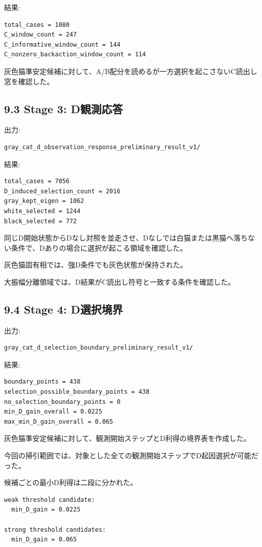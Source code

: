 \documentclass{article}
\begin{document}
結果:

\begin{verbatim}
total_cases = 1080
C_window_count = 247
C_informative_window_count = 144
C_nonzero_backaction_window_count = 114
\end{verbatim}

灰色猫準安定候補に対して、A/B配分を読めるが一方選択を起こさないC読出し窓を確認した。

\subsection{9.3 Stage 3:
D観測応答}\label{stage-3-dux89b3ux6e2cux5fdcux7b54}

出力:

\begin{verbatim}
gray_cat_d_observation_response_preliminary_result_v1/
\end{verbatim}

結果:

\begin{verbatim}
total_cases = 7056
D_induced_selection_count = 2016
gray_kept_eigen = 1062
white_selected = 1244
black_selected = 772
\end{verbatim}

同じD開始状態からDなし対照を並走させ、Dなしでは白猫または黒猫へ落ちない条件で、Dありの場合に選択が起こる領域を確認した。

灰色猫固有相では、強D条件でも灰色状態が保持された。

大振幅分離領域では、D結果がC読出し符号と一致する条件を確認した。

\subsection{9.4 Stage 4:
D選択境界}\label{stage-4-dux9078ux629eux5883ux754c}

出力:

\begin{verbatim}
gray_cat_d_selection_boundary_preliminary_result_v1/
\end{verbatim}

結果:

\begin{verbatim}
boundary_points = 438
selection_possible_boundary_points = 438
no_selection_boundary_points = 0
min_D_gain_overall = 0.0225
max_min_D_gain_overall = 0.065
\end{verbatim}

灰色猫準安定候補に対して、観測開始ステップとD利得の境界表を作成した。

今回の掃引範囲では、対象とした全ての観測開始ステップでD起因選択が可能だった。

候補ごとの最小D利得は二段に分かれた。

\begin{verbatim}
weak threshold candidate:
  min_D_gain = 0.0225

strong threshold candidates:
  min_D_gain = 0.065
\end{verbatim}
\end{document}
